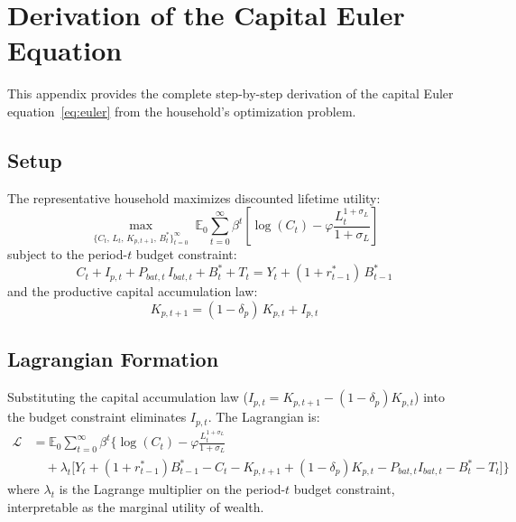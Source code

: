 \documentclass[12pt, a4paper]{article}
\begin{document}
\section{Derivation of the Capital Euler Equation} \label{app:deriv_euler}

This appendix provides the complete step-by-step derivation of the capital Euler equation~\eqref{eq:euler} from the household's optimization problem.

\subsection*{Setup}

The representative household maximizes discounted lifetime utility:
\begin{equation*}
\max_{\{C_t,\, L_t,\, K_{p,t+1},\, B^*_t\}_{t=0}^{\infty}} \;
\mathbb{E}_0 \sum_{t=0}^{\infty} \beta^t
\left[\log(C_t) - \varphi \frac{L_t^{1+\sigma_L}}{1+\sigma_L}\right]
\end{equation*}
subject to the period-$t$ budget constraint:
\begin{equation*}
C_t + I_{p,t} + P_{bat,t}\,I_{bat,t} + B^*_t + T_t
= Y_t + (1+r^*_{t-1})\,B^*_{t-1}
\end{equation*}
and the productive capital accumulation law:
\begin{equation*}
K_{p,t+1} = (1-\delta_p)\,K_{p,t} + I_{p,t}
\end{equation*}

\subsection*{Lagrangian Formation}

Substituting the capital accumulation law ($I_{p,t} = K_{p,t+1} - (1-\delta_p)K_{p,t}$) into the budget constraint eliminates $I_{p,t}$. The Lagrangian is:
\begin{align*}
\mathcal{L} &= \mathbb{E}_0 \sum_{t=0}^{\infty} \beta^t \Bigg\{
\log(C_t) - \varphi \frac{L_t^{1+\sigma_L}}{1+\sigma_L} \\
&\quad + \lambda_t \Big[Y_t + (1+r^*_{t-1})B^*_{t-1} - C_t 
- K_{p,t+1} + (1-\delta_p)K_{p,t}
- P_{bat,t}I_{bat,t} - B^*_t - T_t\Big]
\Bigg\}
\end{align*}
where $\lambda_t$ is the Lagrange multiplier on the period-$t$ budget constraint, interpretable as the marginal utility of wealth.
\end{document}
